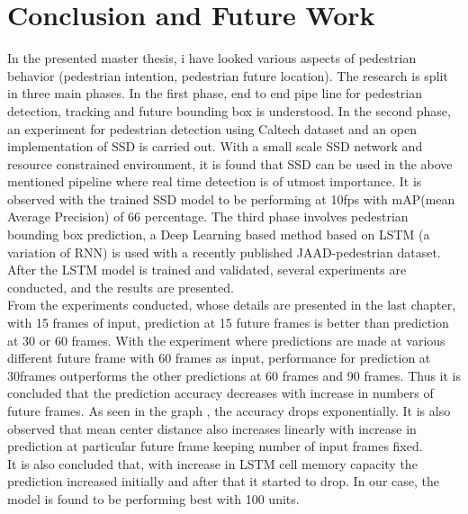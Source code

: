 
\chapter{Conclusion and Future Work}
In the presented master thesis, i have looked various aspects of pedestrian behavior (pedestrian intention, pedestrian future location). The research is split in three main phases. In the first phase, end to end pipe line for pedestrian detection, tracking and future bounding box is understood. In the second phase, an experiment for pedestrian detection using Caltech dataset and an open implementation of SSD is carried out. With a small scale SSD network and resource constrained environment, it is found that SSD can be used in the above mentioned pipeline where real time detection is of utmost importance. It is observed with the trained SSD model to be performing at 10fps with mAP(mean Average Precision) of 66 percentage. The third phase involves pedestrian bounding box prediction, a Deep Learning  based method based on LSTM (a variation of RNN) is used with a recently published JAAD-pedestrian dataset. After the LSTM model is trained and validated, several experiments are conducted, and the results are presented. \\

From the experiments conducted, whose details are presented in the last chapter, with 15 frames of input, prediction at 15 future frames is better than prediction at 30 or 60 frames. With the experiment where predictions are made at various different future frame with 60 frames as input, performance for prediction at 30frames outperforms the other predictions at 60 frames and 90 frames. Thus it is concluded that the prediction accuracy decreases with increase in numbers of future frames. As seen in the graph , the accuracy drops exponentially. It is also observed that mean center distance also increases linearly with increase in prediction at particular future frame keeping number of input frames fixed. \\

It is also concluded that, with increase in LSTM cell memory capacity the prediction increased initially and after that it started to drop. In our case, the model is found to be performing best with 100 units. \\

